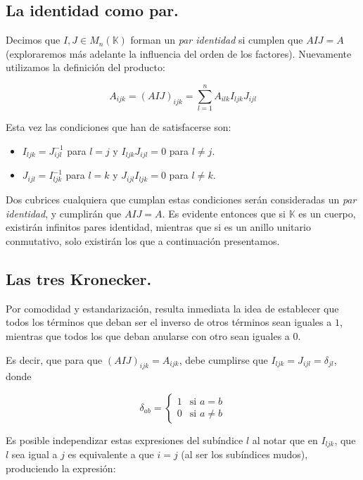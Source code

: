 \documentclass[a4paper, titlepage]{article}
\begin{document}
\newpage

\subsection{La identidad como par.}

Decimos que $I, J \in M_{n} (\mathbb{K})$ forman un \textit{par identidad} si cumplen que $AIJ = A$ (exploraremos más adelante la influencia del orden de los factores). Nuevamente utilizamos la definición del producto:

$$A_{ijk} = (AIJ)_{ijk} = \sum\limits_{l=1}^{n} A_{ilk} I_{ljk} J_{ijl}$$

Esta vez las condiciones que han de satisfacerse son:

\begin{itemize}
	\item $I_{ljk} = J_{ijl}^{-1}$ para $l = j$ y $I_{ljk} J_{ijl} = 0$ para $l \neq j$.
	\item $J_{ijl} = I_{ljk}^{-1}$ para $l = k$ y $J_{ijl} I_{ljk} = 0$ para $l \neq k$.
\end{itemize}

Dos cubrices cualquiera que cumplan estas condiciones serán consideradas un \textit{par identidad}, y cumplirán que $AIJ = A$. Es evidente entonces que si $\mathbb{K}$ es un cuerpo, existirán infinitos pares identidad, mientras que si es un anillo unitario conmutativo, solo existirán los que a continuación presentamos.

\subsection{Las tres Kronecker.}

Por comodidad y estandarización, resulta inmediata la idea de establecer que todos los términos que deban ser el inverso de otros términos sean iguales a $1$, mientras que todos los que deban anularse con otro sean iguales a $0$.

Es decir, que para que $(AIJ)_{ijk} = A_{ijk}$, debe cumplirse que $I_{ljk} = J_{ijl} = \delta_{jl}$, donde

\begin{equation}
	\delta_{ab} =
	\begin{cases}
		1 & \text{si } a = b \\
		0 & \text{si } a \neq b
	\end{cases}
\end{equation}

Es posible independizar estas expresiones del subíndice $l$ al notar que en $I_{ljk}$, que $l$ sea igual a $j$ es equivalente a que $i = j$ (al ser los subíndices mudos), produciendo la expresión:
\end{document}
